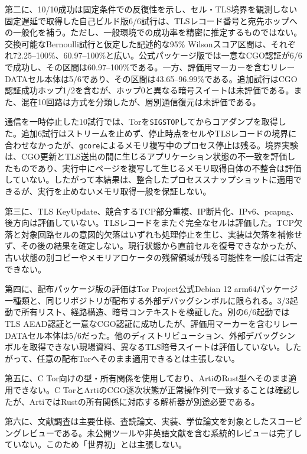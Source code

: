 \documentclass[10pt,a4paper]{ltjsarticle}
\newcommand{\code}[1]{\nolinkurl{#1}}
\begin{document}
第二に、10/10成功は固定条件での反復性を示し、セル・TLS境界を観測しない固定遅延で取得した自己ビルド版6/6試行は、TLSレコード番号と宛先ホップへの一般化を補う。ただし、一般環境での成功率を精密に推定するものではない。交換可能なBernoulli試行と仮定した記述的な95\% Wilsonスコア区間は、それぞれ72.25--100\%、60.97--100\%と広い。公式パッケージ版では一意なCGO認証が6/6で成功し、その区間は60.97--100\%である。一方、評価用マーカーを含むリレーDATAセル本体は5/6であり、その区間は43.65--96.99\%である。追加試行はCGO認証成功ホップ1/2を含むが、ホップ0と異なる暗号スイートは未評価である。また、混在10回路は方式を分類したが、層別通信復元は未評価である。

通信を一時停止した10試行では、Torを\code{SIGSTOP}してからコアダンプを取得した。追加6試行はストリームを止めず、停止時点をセルやTLSレコードの境界に合わせなかったが、\code{gcore}によるメモリ複写中のプロセス停止は残る。境界実験は、CGO更新とTLS送出の間に生じるアプリケーション状態の不一致を評価したものであり、実行中にページを複写して生じるメモリ取得自体の不整合は評価していない。したがって本結果は、整合したプロセススナップショットに適用できるが、実行を止めないメモリ取得一般を保証しない。

第三に、TLS KeyUpdate、競合するTCP部分重複、IP断片化、IPv6、pcapng、後方向は評価していない。TLSレコードをまたぐ完全なセルは評価した。TCP欠落と対象回路セルの意図的欠落はいずれも処理停止を生じ、実装は欠落を補修せず、その後の結果を確定しない。現行状態から直前セルを復号できなかったが、古い状態の別コピーやメモリアロケータの残留領域が残る可能性を一般には否定できない。

第四に、配布パッケージ版の評価はTor Project公式Debian 12 arm64パッケージ一種類と、同じリポジトリが配布する外部デバッグシンボルに限られる。3/3起動で所有リスト、経路構造、暗号コンテキストを検証した。別の6/6起動ではTLS AEAD認証と一意なCGO認証に成功したが、評価用マーカーを含むリレーDATAセル本体は5/6だった。他のディストリビューション、外部デバッグシンボルを取得できない現場資料、異なるTLS暗号スイートは評価していない。したがって、任意の配布Torへそのまま適用できるとは主張しない。

第五に、C Tor向けの型・所有関係を使用しており、ArtiのRust型へそのまま適用できない。C TorとArtiのCGO逐次状態が正常操作列で一致することは確認したが、ArtiではRustの所有関係に対応する解析器が別途必要である。

第六に、文献調査は主要仕様、査読論文、実装、学位論文を対象としたスコーピングレビューである。未公開ツールや非英語文献を含む系統的レビューは完了していない。このため「世界初」とは主張しない。
\end{document}
